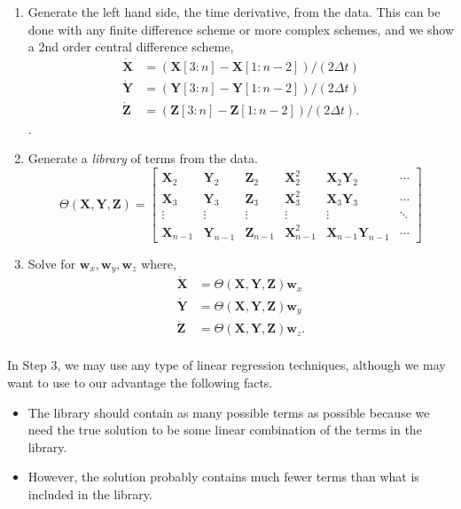 \documentclass{article}
\newcommand{\bb}[1]{\mathbf{#1}}
\theoremstyle{definition}
\begin{document}
\begin{enumerate} [Step 1.]
	\item Generate the left hand side, the time derivative,  from the data. This can be done with any finite difference scheme or more complex schemes, and we show a 2nd order central difference scheme, 
	\begin{align*}
	\dot{\bb{X}} &= (\bb{X}[3:n] - \bb{X}[1:n-2])/(2\Delta t) \\
	\dot{\bb{Y}} &=(\bb{Y}[3:n] - \bb{Y}[1:n-2])/(2\Delta t) \\
	\dot{\bb{Z} }&= (\bb{Z}[3:n] - \bb{Z}[1:n-2])/(2\Delta t) .
	\end{align*}.
	\item Generate a \emph{library} of terms from the data. \[
	\Theta(\bb{X}, \bb{Y}, \bb{Z}) = \begin{bmatrix}
	\bb{X}_2 & 	\bb{Y}_2& 	\bb{Z}_2 & \bb{X}_2^2 & \bb{X}_2\bb{Y}_2 & \cdots \\
	\bb{X}_3 & 	\bb{Y}_3 & 	\bb{Z}_3 & \bb{X}_3^2 & \bb{X}_3\bb{Y}_3 & \cdots\\
	\vdots & \vdots & \vdots & \vdots & \vdots & \ddots \\
	\bb{X}_{n-1} & 	\bb{Y}_{n-1} & 	\bb{Z}_{n-1} & \bb{X}_{n-1}^2 & \bb{X}_{n-1}\bb{Y}_{n-1}& \cdots
	\end{bmatrix}\]
	\item Solve for $\bb{w}_x, \bb{w}_y, \bb{w}_z$ where,
	\begin{align}
	\dot{\bb{X}} &= \Theta(\bb{X}, \bb{Y}, \bb{Z}) \bb{w}_x \\ 
	\dot{\bb{Y}} &= \Theta(\bb{X}, \bb{Y}, \bb{Z}) \bb{w}_y \\ 
	\dot{\bb{Z}} &= \Theta(\bb{X}, \bb{Y}, \bb{Z}) \bb{w}_z. \\ 
	\end{align}
\end{enumerate}

In Step 3, we may use any type of linear regression techniques, although we may want to use to our advantage the following facts.
\begin{itemize}
	\item The library should contain as many possible terms as possible  because we need the true solution to be some linear combination of the terms in the library. 
	\item However, the solution probably contains much fewer terms than what is included in the library. 
\end{itemize}
\end{document}

